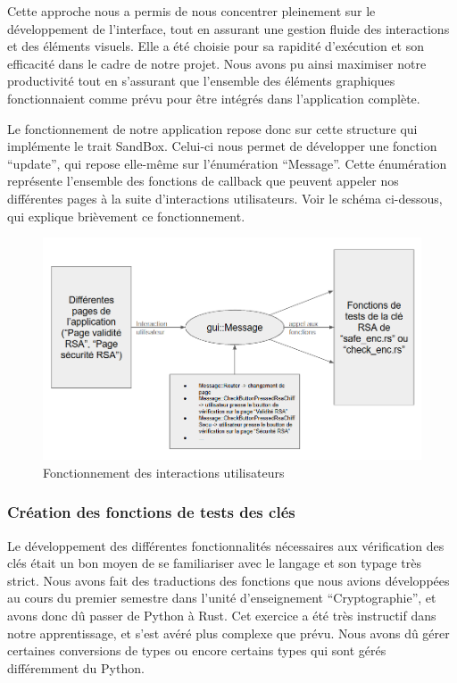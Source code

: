 \documentclass[12pt]{article} %
\begin{document}
Cette approche nous a permis de nous concentrer pleinement sur le développement de l’interface, tout en assurant une gestion fluide des interactions et des éléments visuels. Elle a été choisie pour sa rapidité d'exécution et son efficacité dans le cadre de notre projet. Nous avons pu ainsi maximiser notre productivité tout en s’assurant que l’ensemble des éléments graphiques fonctionnaient comme prévu pour être intégrés dans l'application complète.

Le fonctionnement de notre application repose donc sur cette structure qui implémente le trait SandBox. Celui-ci nous permet de développer une fonction “update”, qui repose elle-même sur l’énumération “Message”. Cette énumération représente l’ensemble des fonctions de callback que peuvent appeler nos différentes pages à la suite d’interactions utilisateurs. Voir le schéma ci-dessous, qui explique brièvement ce fonctionnement.


	\begin{figure}[!h]
		\begin{center}
			\includegraphics[scale=0.5]{images/schemaMessage}
			\caption{Fonctionnement des interactions utilisateurs}
		\end{center}
	\end{figure}

		\subsubsection{Création des fonctions de tests des clés}
		
	Le développement des différentes fonctionnalités nécessaires aux vérification des clés était un bon moyen de se familiariser avec le langage et son typage très strict. Nous avons fait des traductions des fonctions que nous avions développées au cours du premier semestre dans l’unité d’enseignement “Cryptographie”, et avons donc dû passer de Python à Rust. Cet exercice a été très instructif dans notre apprentissage, et s’est avéré plus complexe que prévu. Nous avons dû gérer certaines conversions de types ou encore certains types qui sont  gérés différemment du Python. 
		
\end{document}
